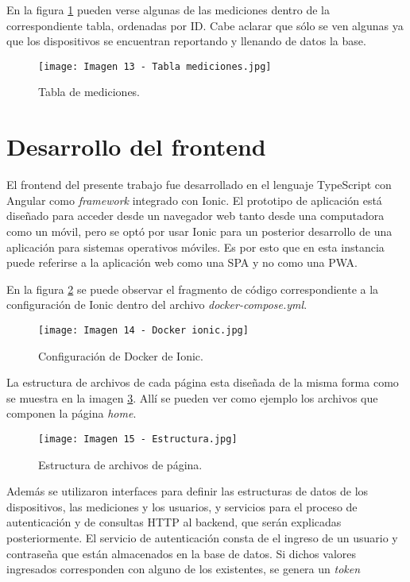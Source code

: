 En la figura \ref{fig:13} pueden verse algunas de las mediciones dentro de la correspondiente tabla, ordenadas por ID. Cabe aclarar que sólo se ven algunas ya que los dispositivos se encuentran reportando y llenando de datos la base.

\begin{figure}[h]
\centering
\texttt{[image: Imagen 13 - Tabla mediciones.jpg]}
\caption[Tabla mediciones]{Tabla de mediciones. \footnotemark}
\label{fig:13}
\end{figure}

\section{Desarrollo del frontend}

El frontend del presente trabajo fue desarrollado en el lenguaje TypeScript con Angular como \textit{framework} integrado con Ionic. El prototipo de aplicación está diseñado para acceder desde un navegador web tanto desde una computadora como un móvil, pero se optó por usar Ionic para un posterior desarrollo de una aplicación para sistemas operativos móviles. Es por esto que en esta instancia puede referirse a la aplicación web como una SPA y no como una PWA.

En la figura \ref{fig:14} se puede observar el fragmento de código correspondiente a la configuración de Ionic dentro del archivo \textit{docker-compose.yml}.

\begin{figure}[h]
\centering
\texttt{[image: Imagen 14 - Docker ionic.jpg]}
\caption[Configuración Ionic]{Configuración de Docker de Ionic. \footnotemark}
\label{fig:14}
\end{figure}

La estructura de archivos de cada página esta diseñada de la misma forma como se muestra en la imagen \ref{fig:15}. Allí se pueden ver como ejemplo los archivos que componen la página \textit{home}.

\begin{figure}[h]
\centering
\texttt{[image: Imagen 15 - Estructura.jpg]}
\caption[Estructura página]{Estructura de archivos de página. \footnotemark}
\label{fig:15}
\end{figure}

Además se utilizaron interfaces para definir las estructuras de datos de los dispositivos, las mediciones y los usuarios, y servicios para el proceso de autenticación y de consultas HTTP al backend, que serán explicadas posteriormente. El servicio de autenticación consta de el ingreso de un usuario y contraseña que están almacenados en la base de datos. Si dichos valores ingresados corresponden con alguno de los existentes, se genera un \textit{token} 

